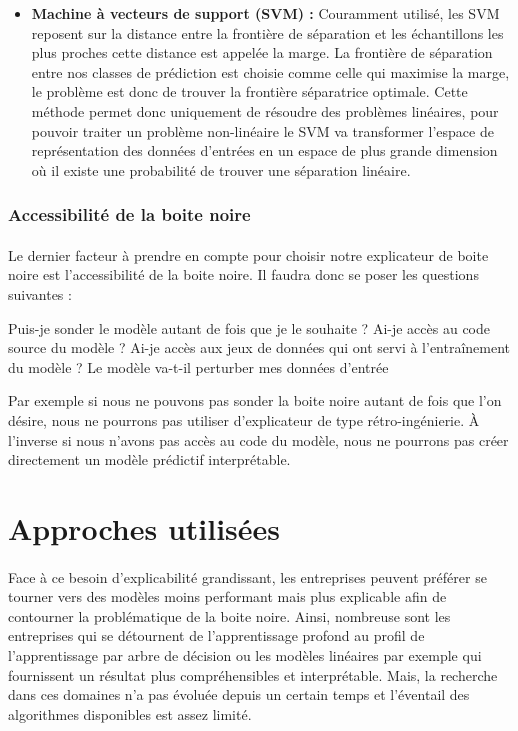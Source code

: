 \begin{itemize}
    \item \textbf{Machine à vecteurs de support (SVM) :} Couramment utilisé, les SVM reposent sur la distance entre la frontière de séparation et les échantillons les plus proches cette distance est appelée la marge. La frontière de séparation entre nos classes de prédiction est choisie comme celle qui maximise la marge, le problème est donc de trouver la frontière séparatrice optimale. Cette méthode permet donc uniquement de résoudre des problèmes linéaires, pour pouvoir traiter un problème non-linéaire le SVM va transformer l'espace de représentation des données d'entrées en un espace de plus grande dimension où il existe une probabilité de trouver une séparation linéaire.
\end{itemize}

\subsubsection{Accessibilité de la boite noire}
\paragraph{}Le dernier facteur à prendre en compte pour choisir notre explicateur de boite noire est l'accessibilité de la boite noire. Il faudra donc se poser les questions suivantes :\par
Puis-je sonder le modèle autant de fois que je le souhaite ? Ai-je accès au code source du modèle ? Ai-je accès aux jeux de données qui ont servi à l'entraînement du modèle ? Le modèle va-t-il perturber mes données d'entrée\par
Par exemple si nous ne pouvons pas sonder la boite noire autant de fois que l'on désire, nous ne pourrons pas utiliser d'explicateur de type rétro-ingénierie. À l'inverse si nous n'avons pas accès au code du modèle, nous ne pourrons pas créer directement un modèle prédictif interprétable.


\section{Approches utilisées}
\paragraph{}Face à ce besoin d'explicabilité grandissant, les entreprises peuvent préférer se tourner vers des modèles moins performant mais plus explicable afin de contourner la problématique de la boite noire. Ainsi, nombreuse sont les entreprises qui se détournent de l'apprentissage profond au profil de l'apprentissage par arbre de décision ou les modèles linéaires par exemple qui fournissent un résultat plus compréhensibles et interprétable. Mais, la recherche dans ces domaines n'a pas évoluée depuis un certain temps et l'éventail des algorithmes disponibles est assez limité.

